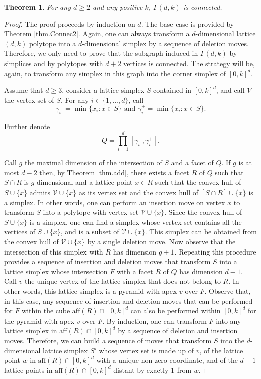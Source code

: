 \documentclass[a4paper]{article}
\newtheorem{theorem}{Theorem}
\begin{document}
\begin{theorem}\label{lem.Connecd}
For any $d\geq2$ and any positive $k$, $\Gamma(d,k)$ is connected.
\end{theorem}
\begin{proof}
The proof proceeds by induction on $d$. The base case is provided by Theorem \ref{thm.Connec2}. Again, one can always transform a $d$-dimensional lattice $(d,k)$ polytope into a $d$-dimensional simplex by a sequence of deletion moves. Therefore, we only need to prove that the subgraph induced in $\Gamma(d,k)$ by simplices and by polytopes with $d+2$ vertices is connected. The strategy will be, again, to transform any simplex in this graph into the corner simplex of $[0,k]^d$.

Assume that $d\geq3$, consider a lattice simplex $S$ contained in $[0,k]^d$, and call $\mathcal{V}$ the vertex set of $S$. For any $i\in\{1, ..., d\}$, call
$$
\gamma_i^-=\min\{x_i:x\in{S}\}\mbox{ and }\gamma_i^+=\min\{x_i:x\in{S}\}\mbox{.}
$$

Further denote
$$
Q=\prod_{i=1}^d[\gamma_i^-,\gamma_i^+]\mbox{.}
$$

Call $g$ the maximal dimension of the intersection of $S$ and a facet of $Q$. If $g$ is at most $d-2$ then, by Theorem \ref{thm.add}, there exists a facet $R$ of $Q$ such that $S\cap{R}$ is $g$-dimensional and a lattice point $x\in{R}$ such that the convex hull of $S\cup\{x\}$ admits $\mathcal{V}\cup\{x\}$ as its vertex set and the convex hull of $[S\cap{R}]\cup\{x\}$ is a simplex. In other words, one can perform an insertion move on vertex $x$ to transform $S$ into a polytope with vertex set $\mathcal{V}\cup\{x\}$. Since the convex hull of $S\cup\{x\}$ is a simplex, one can find a simplex whose vertex set contains all the vertices of $S\cup\{x\}$, and is a subset of $\mathcal{V}\cup\{x\}$. This simplex can be obtained from the convex hull of $\mathcal{V}\cup\{x\}$ by a single deletion move. Now observe that the intersection of this simplex with $R$ has dimension $g+1$. Repeating this procedure provides a sequence of insertion and deletion moves that transform $S$ into a lattice simplex whose intersection $F$ with a facet $R$ of $Q$ has dimension $d-1$. Call $v$ the unique vertex of the lattice simplex that does not belong to $R$. In other words, this lattice simplex is a pyramid with apex $v$ over $F$. Observe that, in this case, any sequence of insertion and deletion moves that can be performed for $F$ within the cube $\mathrm{aff}(R)\cap[0,k]^d$ can also be performed within $[0,k]^d$ for the pyramid with apex $v$ over $F$. By induction, one can transform $F$ into any lattice simplex in $\mathrm{aff}(R)\cap[0,k]^d$ by a sequence of deletion and insertion moves. Therefore, we can build a sequence of moves that transform $S$ into the $d$-dimensional lattice simplex $S'$ whose vertex set is made up of $v$, of the lattice point $w$ in $\mathrm{aff}(R)\cap[0,k]^d$ with a unique non-zero coordinate, and of the $d-1$ lattice points in $\mathrm{aff}(R)\cap[0,k]^d$ distant by exactly $1$ from $w$.


\end{proof}
\end{document}

